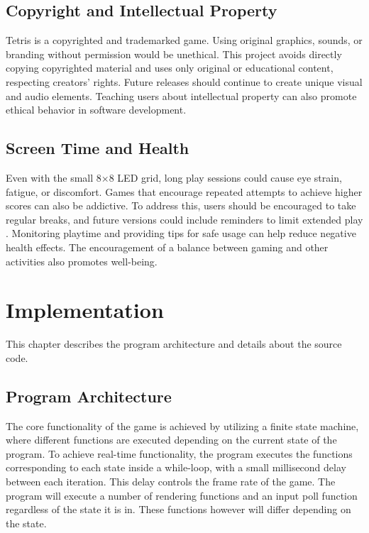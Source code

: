 \documentclass[11pt,titlepage,openright]{book}
\begin{document}
\section{Copyright and Intellectual Property}
Tetris is a copyrighted and trademarked game. Using original graphics, sounds, or branding without permission would be unethical. This project avoids directly copying copyrighted material and uses only original or educational content, respecting creators’ rights. Future releases should continue to create unique visual and audio elements. Teaching users about intellectual property can also promote ethical behavior in software development.

\section{Screen Time and Health}
Even with the small 8×8 LED grid, long play sessions could cause eye strain, fatigue, or discomfort. Games that encourage repeated attempts to achieve higher scores can also be addictive. To address this, users should be encouraged to take regular breaks, and future versions could include reminders to limit extended play \cite{Ferguson2017}. Monitoring playtime and providing tips for safe usage can help reduce negative health effects. The encouragement of a balance between gaming and other activities also promotes well-being.

\chapter{Implementation}
This chapter describes the program architecture and details about the source code.

\section{Program Architecture}
The core functionality of the game is achieved by utilizing a finite state machine, where different functions are executed depending on the current state of the program. To achieve real-time functionality, the program executes the functions corresponding to each state inside a while-loop, with a small millisecond delay between each iteration. This delay controls the frame rate of the game. The program will execute a number of rendering functions and an input poll function regardless of the state it is in. These functions however will differ depending on the state.
\end{document}
